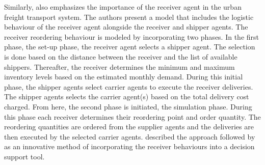 
Similarly, \citet{anand2014ontology} also emphasizes the importance of the receiver agent in the urban freight transport system. The authors present a model that includes the logistic behaviour of the receiver agent alongside the receiver and shipper agents. The receiver reordering behaviour is modeled by incorporating two phases. In the first phase, the set-up phase, the receiver agent selects a shipper agent. The selection is done based on the distance between the receiver and the list of available shippers. Thereafter, the receiver determines the minimum and maximum inventory levels based on the estimated monthly demand. During this initial phase, the shipper agents select carrier agents to execute the receiver deliveries. The shipper agents selects the carrier agent(s) based on the total delivery cost charged. From here, the second phase is initiated, the simulation phase. During this phase each receiver determines their reordering point and order quantity. The reordering quantities are ordered from the supplier agents and the deliveries are then executed by the selected carrier agents. \citet{bean2020behavioural} described the approach followed by \citet{anand2014ontology} as an innovative method of incorporating the receiver behaviours into a decision support tool. \par

